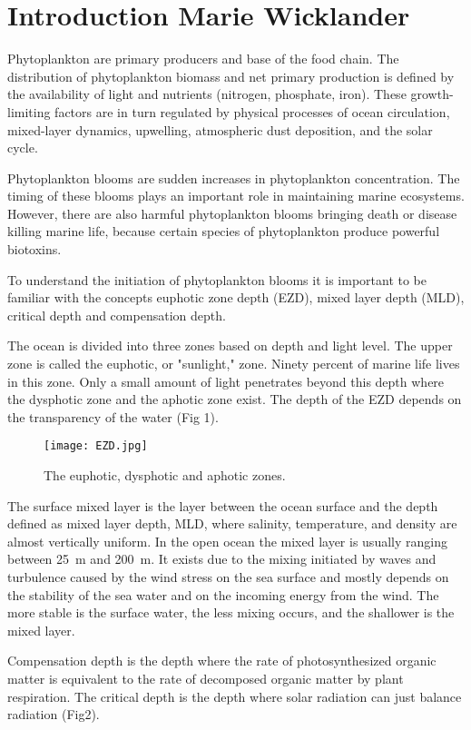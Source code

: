 \documentclass[../Main.tex]{subfiles}
\begin{document}
\section*{\crule[blue]{.3cm}{.3cm} Introduction \scriptsize{Marie Wicklander}}
Phytoplankton are primary producers and base of the food chain.
The distribution of phytoplankton biomass and net primary production is defined by the availability of light and nutrients (nitrogen, phosphate, iron). 
These growth-limiting factors are in turn regulated by physical processes of ocean circulation, 
mixed-layer dynamics, upwelling, atmospheric dust deposition, and the solar cycle.\supercite{Behrenfeld}

Phytoplankton blooms are sudden increases in phytoplankton concentration. 
The timing of these blooms plays an important role in maintaining marine ecosystems. 
However, there are also harmful phytoplankton blooms bringing death or disease killing marine life, 
because certain species of phytoplankton produce powerful biotoxins.\supercite{Smayda97whatis}

To understand the initiation of phytoplankton blooms it is important to be familiar with the concepts euphotic zone depth (EZD), 
mixed layer depth (MLD), critical depth and compensation depth. 

The ocean is divided into three zones based on depth and light level. 
The upper zone is called the euphotic, or "sunlight," zone. Ninety percent of marine life lives in this zone. 
Only a small amount of light penetrates beyond this depth where the dysphotic zone and the aphotic zone exist. 
The depth of the EZD depends on the transparency of the water (Fig 1).\supercite{fig1}
\begin{figure}[H]
\texttt{[image: EZD.jpg]}
\caption{ The euphotic, dysphotic and aphotic zones.\supercite{fig1}}
\end{figure}
The surface mixed layer is the layer between the ocean surface and the depth defined as mixed layer depth, MLD, where salinity, temperature, and density are almost vertically uniform. 
In the open ocean the mixed layer is usually ranging between \SI{25}{m} and \SI{200}{m}. 
It exists due to the mixing initiated by waves and turbulence caused by the wind stress on the sea surface and mostly depends on the stability of the sea water and on the incoming energy from the wind. 
The more stable is the surface water, the less mixing occurs, and the shallower is the mixed layer.\supercite{JC00}

Compensation depth is the depth where the rate of photosynthesized organic matter is equivalent to the rate of decomposed organic matter by plant respiration. 
The critical depth is the depth where solar radiation can just balance radiation (Fig2).\supercite{Sverdrup1953OnCF} 
\end{document}
